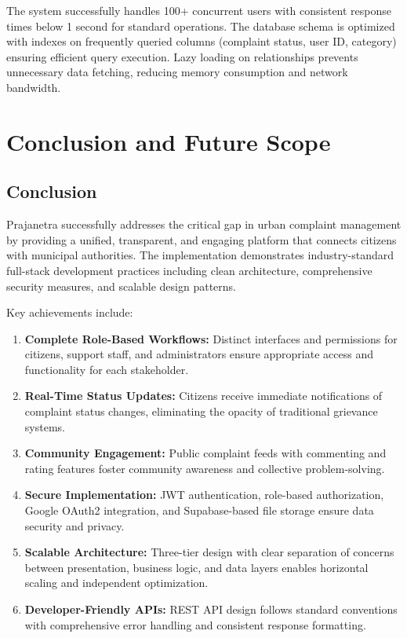 \documentclass[12pt,a4paper]{report}
\begin{document}
The system successfully handles 100+ concurrent users with consistent response times below 1 second for standard operations. The database schema is optimized with indexes on frequently queried columns (complaint status, user ID, category) ensuring efficient query execution. Lazy loading on relationships prevents unnecessary data fetching, reducing memory consumption and network bandwidth.


\chapter{Conclusion and Future Scope}

\section{Conclusion}
Prajanetra successfully addresses the critical gap in urban complaint management by providing a unified, transparent, and engaging platform that connects citizens with municipal authorities. The implementation demonstrates industry-standard full-stack development practices including clean architecture, comprehensive security measures, and scalable design patterns.

Key achievements include:

\begin{enumerate}
    \item \textbf{Complete Role-Based Workflows:} Distinct interfaces and permissions for citizens, support staff, and administrators ensure appropriate access and functionality for each stakeholder.
    
    \item \textbf{Real-Time Status Updates:} Citizens receive immediate notifications of complaint status changes, eliminating the opacity of traditional grievance systems.
    
    \item \textbf{Community Engagement:} Public complaint feeds with commenting and rating features foster community awareness and collective problem-solving.
    
    \item \textbf{Secure Implementation:} JWT authentication, role-based authorization, Google OAuth2 integration, and Supabase-based file storage ensure data security and privacy.
    
    \item \textbf{Scalable Architecture:} Three-tier design with clear separation of concerns between presentation, business logic, and data layers enables horizontal scaling and independent optimization.
    
    \item \textbf{Developer-Friendly APIs:} REST API design follows standard conventions with comprehensive error handling and consistent response formatting.
\end{enumerate}
\end{document}
